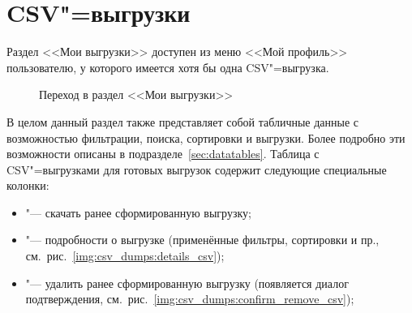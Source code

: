 \graphicspath{ {images/csv_dumps/} }
\section{CSV"=выгрузки} \label{sec:csv_dumps}

Раздел <<Мои выгрузки>> доступен из меню <<Мой профиль>> пользователю, у которого имеется хотя бы одна CSV"=выгрузка.

\begin{figure}[H]
	\caption{Переход в раздел <<Мои выгрузки>>}
	\label{img:employee:my_dumps}
\end{figure}

В целом данный раздел также представляет собой табличные данные с возможностью фильтрации, поиска, сортировки и выгрузки.
Более подробно эти возможности описаны в подразделе~\ref{sec:datatables}. Таблица с CSV"=выгрузками для готовых выгрузок 
содержит следующие специальные колонки:
\begin{itemize}
	\item {} "--- скачать ранее сформированную выгрузку;
	\item {} "--- подробности о выгрузке (применённые фильтры, сортировки и пр.,
	см.\ рис.~\ref{img:csv_dumps:details_csv});
	\item {} "--- удалить ранее сформированную выгрузку (появляется диалог подтверждения,
	см.\ рис.~\ref{img:csv_dumps:confirm_remove_csv});
\end{itemize}

